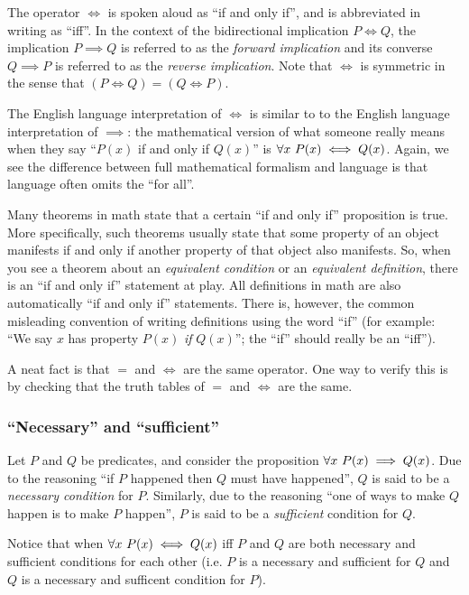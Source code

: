 The operator $\iff$ is spoken aloud as ``if and only if'', and is abbreviated in writing as ``iff''. In the context of the bidirectional implication $P \iff Q$, the implication $P \implies Q$ is referred to as the \textit{forward implication} and its converse $Q \implies P$ is referred to as the \textit{reverse implication}. Note that $\iff$ is symmetric in the sense that $(P \iff Q) = (Q \iff P)$.

The English language interpretation of $\iff$ is similar to to the English language interpretation of $\implies$: the mathematical version of what someone really means when they say ``$P(x)$ if and only if $Q(x)$'' is $\forall x \text{ } P(x) \iff Q(x)$. Again, we see the difference between full mathematical formalism and language is that language often omits the ``for all''.

Many theorems in math state that a certain ``if and only if'' proposition is true. More specifically, such theorems usually state that some property of an object manifests if and only if another property of that object also manifests. So, when you see a theorem about an \textit{equivalent condition} or an \textit{equivalent definition}, there is an ``if and only if'' statement at play. All definitions in math are also automatically ``if and only if'' statements. There is, however, the common misleading convention of writing definitions using the word ``if'' (for example: ``We say $x$ has property $P(x)$ \textit{if} $Q(x)$''; the ``if'' should really be an ``iff'').

A neat fact is that $=$ and $\iff$ are the same operator. One way to verify this is by checking that the truth tables of $=$ and $\iff$ are the same.

\subsubsection*{``Necessary'' and ``sufficient''}

Let $P$ and $Q$ be predicates, and consider the proposition $\forall x \text{ } P(x) \implies Q(x)$. Due to the reasoning ``if $P$ happened then $Q$ must have happened'', $Q$ is said to be a \textit{necessary condition} for $P$. Similarly, due to the reasoning ``one of ways to make $Q$ happen is to make $P$ happen'', $P$ is said to be a \textit{sufficient} condition for $Q$. 

Notice that when $\forall x \text{ } P(x) \iff Q(x)$ iff $P$ and $Q$ are both necessary and sufficient conditions for each other (i.e. $P$ is a necessary and sufficient for $Q$ and $Q$ is a necessary and sufficent condition for $P$).

